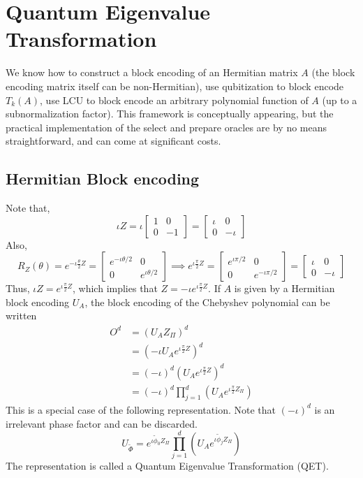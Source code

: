 \documentclass[12pt, oneside]{book}
\theoremstyle{definition}
\theoremstyle{definition}
\theoremstyle{remark}
\begin{document}
\chapter{Quantum Eigenvalue Transformation}
We know how to construct a block encoding of an Hermitian matrix $A$ (the block encoding matrix itself can be non-Hermitian), use qubitization to block encode $T_k(A)$, use LCU to block encode an arbitrary polynomial function of $A$ (up to a subnormalization factor). This framework is conceptually appearing, but the practical implementation of the select and prepare oracles are by no means straightforward, and can come at significant costs.

\section{Hermitian Block encoding}
Note that, 
\[
\iota Z = \iota \begin{bmatrix}
    1 & 0 \\
    0 & -1
\end{bmatrix}=\begin{bmatrix}
    \iota &0 \\
    0 & -\iota 
\end{bmatrix}
\]
Also, 
\[
R_Z(\theta)= e^{-\iota \frac{\theta}{2} Z} = \begin{bmatrix}
    e^{-\iota \theta/2} & 0\\
    0 & e^{\iota \theta/2}
\end{bmatrix} \implies e^{\iota \frac{\pi}{2}Z}= \begin{bmatrix}
    e^{\iota \pi/2} & 0\\
    0 & e^{-\iota \pi/2}
\end{bmatrix}=\begin{bmatrix}
    \iota & 0\\
    0&-\iota 
\end{bmatrix}
\]
Thus, $\iota Z=e^{\iota \frac{\pi}{2}Z}$, which implies that $Z=-\iota e^{\iota \frac{\pi}{2}Z}$. If $A$ is given by a Hermitian block encoding $U_A$, the block encoding of the Chebyshev polynomial can be written
\begin{align*}
O^d &= (U_AZ_{\Pi})^d\\
&= (-\iota U_Ae^{\iota \frac{\pi}{2}Z})^d\\
&=(-\iota)^d(U_Ae^{\iota \frac{\pi}{2}Z})^d \\
&=(-\iota)^d \prod_{j=1}^d (U_Ae^{\iota \frac{\pi}{2}Z_{\Pi}})
\end{align*}
This is a special case of the following representation. Note that $(-\iota)^d$ is an irrelevant phase factor and can be discarded.
\[
U_{\tilde{\Phi}} = e^{\iota \tilde{\phi}_0 Z_{\Pi}}\prod_{j=1}^d (U_Ae^{\iota \tilde{\phi}_jZ_{\Pi}})
\]
The representation is called a Quantum Eigenvalue Transformation (QET).
\end{document}
